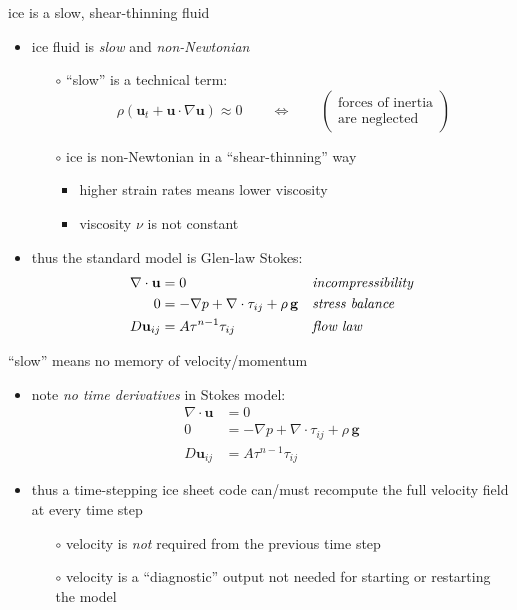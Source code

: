 \documentclass[10pt]{beamer}
\begin{document}
\begin{frame}{ice is a slow, shear-thinning fluid}

\begin{itemize}
\item ice fluid is \emph{slow} and \emph{non-Newtonian}
    \begin{itemize}
    \item[$\circ$] ``slow'' is a technical term:
      $$\rho \left(\mathbf{u}_t + \mathbf{u}\cdot\nabla \mathbf{u}\right) \approx 0 \qquad \iff \qquad \begin{pmatrix} \text{forces of inertia} \\ \text{are neglected} \end{pmatrix}$$
    \item[$\circ$] ice is non-Newtonian in a ``shear-thinning'' way
        \begin{itemize}
        \item higher strain rates means lower viscosity
        \item viscosity $\nu$ is not constant
        \end{itemize}
    \end{itemize}

\bigskip
\item thus the standard model is Glen-law Stokes:
\begin{align*}
\nabla \cdot \mathbf{u} &= 0 &&\text{\emph{incompressibility}} \\
0 &= - \nabla p + \nabla \cdot \tau_{ij} + \rho\, \mathbf{g} &&\text{\emph{stress balance}} \\
D\mathbf{u}_{ij} &= A \tau^{n-1} \tau_{ij} &&\text{\emph{flow law}}
\end{align*}

\end{itemize}
\end{frame}


\begin{frame}{``slow'' means no memory of velocity/momentum}

\begin{itemize}
\item note \emph{no time derivatives} in Stokes model:
\small
\begin{align*}
\nabla \cdot \mathbf{u} &= 0 \\
0 &= - \nabla p + \nabla \cdot \tau_{ij} + \rho\, \mathbf{g} \\
D\mathbf{u}_{ij} &= A \tau^{n-1} \tau_{ij}
\end{align*}
\normalsize
\item thus a time-stepping ice sheet code can/must recompute the full velocity field at every time step
  \begin{itemize}
  \item[$\circ$] velocity is \emph{not} required from the previous time step
  \item[$\circ$] velocity is a ``diagnostic'' output not needed for starting or restarting the model
  \end{itemize}
\end{itemize}
\end{frame}
\end{document}

